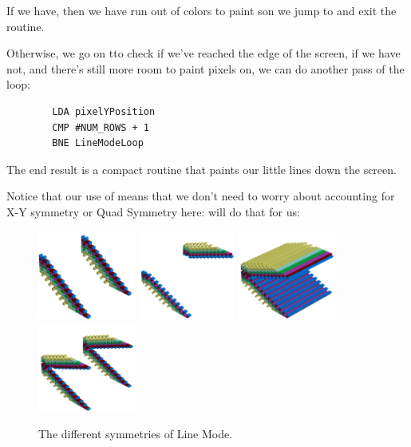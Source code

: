 If we have, then we have run out of colors to paint son we jump to
 and exit the routine.

Otherwise, we go on tto check if we've reached the edge of the screen, if we have not, and there's still more room
to paint pixels on, we can do another pass of the loop:

\begin{lstlisting}
        LDA pixelYPosition
        CMP #NUM_ROWS + 1
        BNE LineModeLoop
\end{lstlisting}

The end result is a compact routine that paints our little lines down the screen. 

Notice that our use of 
means that we don't need to worry about accounting for X-Y symmetry or Quad Symmetry here:  will do
that for us:
\begin{figure}[H]
    \centering
    \includegraphics[width=3.2cm]{linemode/symmetries/pattern1-0-45.png}%
    \includegraphics[width=3.2cm]{linemode/symmetries/pattern1-1-45.png}%
    \includegraphics[width=3.2cm]{linemode/symmetries/pattern1-3-45.png}%
    \includegraphics[width=3.2cm]{linemode/symmetries/pattern1-5-45.png}%
    \hspace{0.2cm}
    \caption{
      The different symmetries of Line Mode. 
      }
\end{figure}


\clearpage
